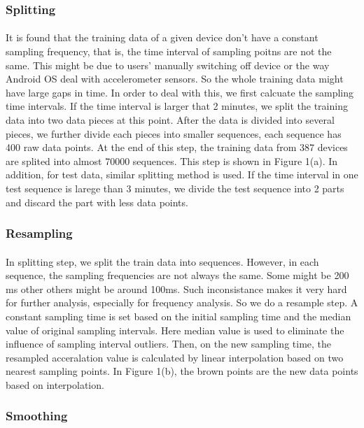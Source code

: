 \documentclass{article}
\begin{document}
		
		
		 \subsubsection{Splitting}
		\paragraph{}It is found that the training data of a given device don't have a constant sampling frequency, that is, the time interval of sampling poitns are not the same. This might be due to users' manually switching off device or the way Android OS deal with accelerometer sensors. So the whole training data might have large gaps in time. In order to deal with this, we first calcuate the sampling time intervals. If the time interval is larger that 2 minutes, we split the training data into two data pieces at this point. After the data is divided into several pieces, we further divide each pieces into smaller sequences, each sequence has 400 raw data points. At the end of this step, the training data from 387 devices are splited into almost 70000 sequences. This step is shown in Figure 1(a).
		In addition, for test data, similar splitting method is used. If the time interval in one test sequence is larege than 3 minutes, we divide the test sequence into 2 parts and discard the part with less data points. 
		\subsubsection{Resampling}
		\paragraph{} In splitting step, we split the train data into sequences. However, in each sequence, the sampling frequencies are not always the same. Some might be 200 ms other others might be around 100ms.  Such inconsistance makes it very hard for further analysis, especially for frequency analysis. So we do a resample step. A constant sampling time is set based on the initial sampling time and the median value of original sampling intervals. Here median value is used to eliminate the influence of sampling interval outliers. Then, on the new sampling time, the resampled acceralation value is calculated by linear interpolation based on two nearest sampling points. In Figure 1(b), the brown points are the new data points based on interpolation. 
		\subsubsection{Smoothing}
\end{document}
